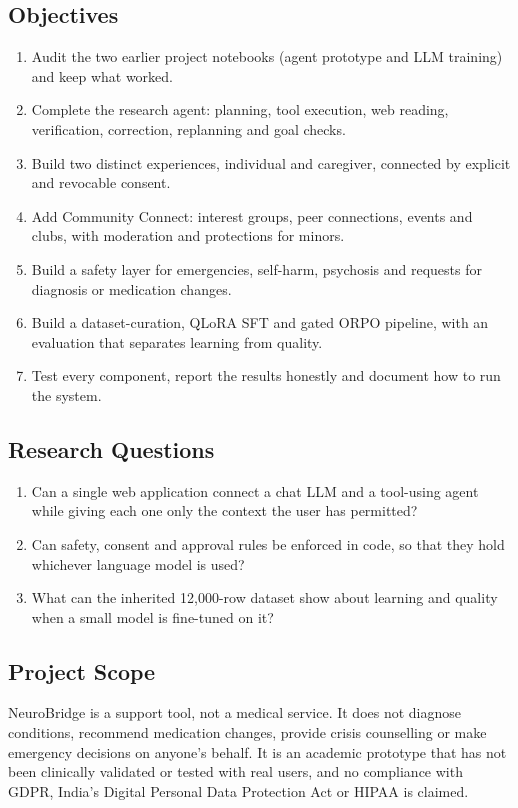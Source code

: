 \documentclass[11pt,a4paper]{article}
\begin{document}
\subsection{Objectives}
\begin{enumerate}
  \item Audit the two earlier project notebooks (agent prototype and LLM training) and keep what worked.
  \item Complete the research agent: planning, tool execution, web reading, verification, correction, replanning and goal checks.
  \item Build two distinct experiences, individual and caregiver, connected by explicit and revocable consent.
  \item Add Community Connect: interest groups, peer connections, events and clubs, with moderation and protections for minors.
  \item Build a safety layer for emergencies, self-harm, psychosis and requests for diagnosis or medication changes.
  \item Build a dataset-curation, QLoRA SFT and gated ORPO pipeline, with an evaluation that separates learning from quality.
  \item Test every component, report the results honestly and document how to run the system.
\end{enumerate}

\subsection{Research Questions}
\begin{enumerate}[label=\textbf{RQ\arabic*.}]
  \item Can a single web application connect a chat LLM and a tool-using agent while giving each one only the context the user has permitted?
  \item Can safety, consent and approval rules be enforced in code, so that they hold whichever language model is used?
  \item What can the inherited 12,000-row dataset show about learning and quality when a small model is fine-tuned on it?
\end{enumerate}

\subsection{Project Scope}
NeuroBridge is a support tool, not a medical service. It does not diagnose conditions, recommend
medication changes, provide crisis counselling or make emergency decisions on anyone's behalf. It is an
academic prototype that has not been clinically validated or tested with real users, and no
compliance with GDPR, India's Digital Personal Data Protection Act or HIPAA is claimed.
\end{document}
